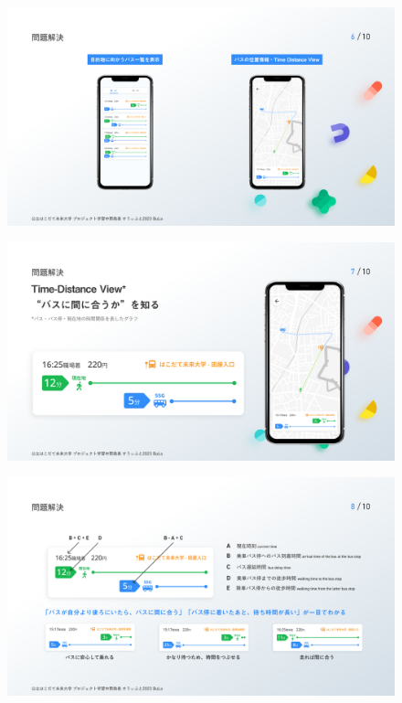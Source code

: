 \begin{figure}[htbp]
    \includegraphics[width=14cm]{images/slide6.png}
    \label{fig:slide6}
\end{figure}
\begin{figure}[htbp]
    \includegraphics[width=14cm]{images/slide7.png}
    \label{fig:slide7}
\end{figure}
\begin{figure}[htbp]
    \includegraphics[width=14cm]{images/slide8.png}
    \label{fig:slide8}
\end{figure}
